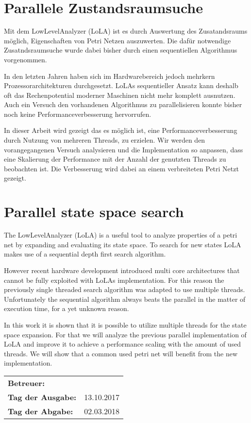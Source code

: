 \section*{Parallele Zustandsraumsuche}
Mit dem LowLevelAnalyzer (LoLA) ist es durch Auswertung des Zusatandsraums möglich, Eigenschaften von Petri Netzen auszuwerten. Die dafür notwendige Zusatndsraumsuche wurde dabei bisher durch einen sequentiellen Algorithmus vorgenommen.

In den letzten Jahren haben sich im Hardwarebereich jedoch mehrkern Prozessorarchitekturen durchgesetzt. LoLAs sequentieller Ansatz kann deshalb oft das Rechenpotential moderner Maschinen nicht mehr komplett ausnutzen. Auch ein Versuch den vorhandenen Algorithmus zu parallelisieren konnte bisher noch keine Performanceverbesserung hervorrufen.

In dieser Arbeit wird gezeigt das es möglich ist, eine Performanceverbesserung durch Nutzung von mehreren Threads, zu erzielen. Wir werden den vorangegangenen Versuch analysieren und die Implementation so anpassen, dass eine Skalierung der Performance mit der Anzahl der genutzten Threads zu beobachten ist. Die Verbesserung wird dabei an einem verbreiteten Petri Netzt gezeigt.

\section*{Parallel state space search}
The LowLevelAnalyzer (LoLA) is a useful tool to analyze properties of a petri net by expanding and evaluating its state space. To search for new states LoLA makes use of a sequential depth first search algorithm.

However recent hardware development introduced multi core architectures that cannot be fully exploited with LoLAs implementation. For this reason the previously single threaded search algorithm was adapted to use multiple threads. Unfortunately the sequential algorithm always beats the parallel in the matter of execution time, for a yet unknown reason.

In this work it is shown that it is possible to utilize multiple threads for the state space expansion. For that we will analyze the previous parallel implementation of LoLA and improve it to achieve a performance scaling with the amount of used threads. We will show that a common used petri net will benefit from the new implementation.



\vfill

\begin{tabular}{ll}
	\bfseries Betreuer: & \parbox[t]{10cm}{\betreuer }\vspace{5mm} \\
	\bfseries Tag der Ausgabe: & 13.10.2017 \\
	\bfseries Tag der Abgabe: & 02.03.2018 \\
\end{tabular}